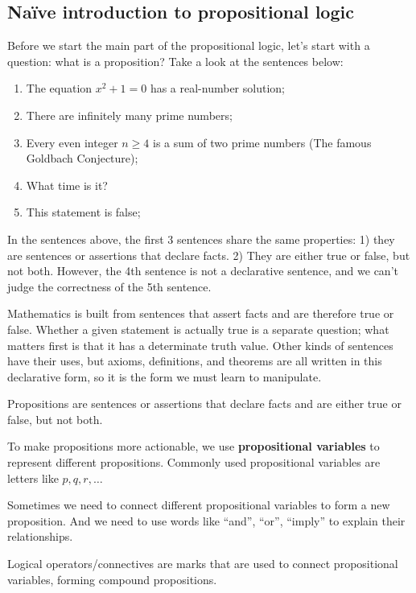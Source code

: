 \subsection{Naïve introduction to propositional logic}
Before we start the main part of the propositional logic, let’s start with a question: what is a proposition? Take a look at the sentences below:
\begin{enumerate}
    \item The equation $x^2+1=0$ has a real-number solution;
    \item There are infinitely many prime numbers;
    \item Every even integer $n \ge 4$ is a sum of two prime numbers (The famous Goldbach Conjecture);
    \item What time is it?
    \item This statement is false;
\end{enumerate}
In the sentences above, the first 3 sentences share the same properties: 1) they are sentences or assertions that declare facts. 2) They are either true or false, but not both. However, the 4th sentence is not a declarative sentence, and we can’t judge the correctness of the 5th sentence.

Mathematics is built from sentences that assert facts and are therefore true or false. Whether a given statement is actually true is a separate question; what matters first is that it has a determinate truth value. Other kinds of sentences have their uses, but axioms, definitions, and theorems are all written in this declarative form, so it is the form we must learn to manipulate.

\begin{definition}[Proposition]
Propositions are sentences or assertions that declare facts and are either true or false, but not both.
\end{definition}

To make propositions more actionable, we use \textbf{propositional variables} to represent different propositions. Commonly used propositional variables are letters like $p, q, r, \dots$

Sometimes we need to connect different propositional variables to form a new proposition. And we need to use words like “and”, “or”, “imply” to explain their relationships.

\begin{definition}
Logical operators/connectives are marks that are used to connect propositional variables, forming compound propositions.
\end{definition}

